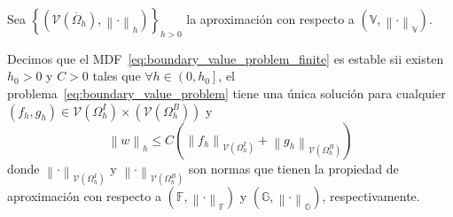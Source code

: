 Sea
\begin{math}
    \left\{
    \left(
    \mathcal{V}\left(\overline{\Omega}_{h}\right),
    \left\|\cdot\right\|_{h}
    \right)
    \right\}_{h>0}
\end{math}
la aproximación con respecto a
\begin{math}
    \left(
    \mathbb{V},
    {\left\|\cdot\right\|}_{\mathbb{V}}
    \right)
\end{math}.

\begin{definition}[Estabilidad]
    Decimos que el MDF~\eqref{eq:boundary_value_problem_finite} es
    estable sii existen $h_{0}>0$ y $C>0$ tales que
    \begin{math}
        \forall h\in\left(0,h_{0}\right]
    \end{math},
    el problema~\eqref{eq:boundary_value_problem}
    tiene una única solución para cualquier
    \begin{math}
        \left(
        f_{h},g_{h}
        \right)\in
        \mathcal{V}\left(
        \Omega^{I}_{h}
        \right)\times
        \left(
        \mathcal{V}\left(
            \Omega^{B}_{h}
            \right)
        \right)
    \end{math}
    y
    \begin{equation*}
        \left\|w\right\|_{h}\leq
        C\left(
        \left\|f_{h}\right\|_{\mathcal{V}\left(
            \Omega^{I}_{h}
            \right)}+
        \left\|g_{h}\right\|_{\mathcal{V}\left(
            \Omega^{B}_{h}
            \right)}
        \right)
    \end{equation*}
    donde
    \begin{math}
        {\left\|\cdot\right\|}_{\mathcal{V}\left(
            \Omega^{I}_{h}
            \right)}
    \end{math}
    y
    \begin{math}
        {\left\|\cdot\right\|}_{\mathcal{V}\left(
            \Omega^{B}_{h}
            \right)}
    \end{math}
    son normas que tienen la propiedad de aproximación con respecto a
    \begin{math}
        \left(
        \mathbb{F},
        {\left\|\cdot\right\|}_{\mathbb{F}}
        \right)
    \end{math}
    y
    \begin{math}
        \left(
        \mathbb{G},
        {\left\|\cdot\right\|}_{\mathbb{G}}
        \right)
    \end{math},
    respectivamente.
\end{definition}

